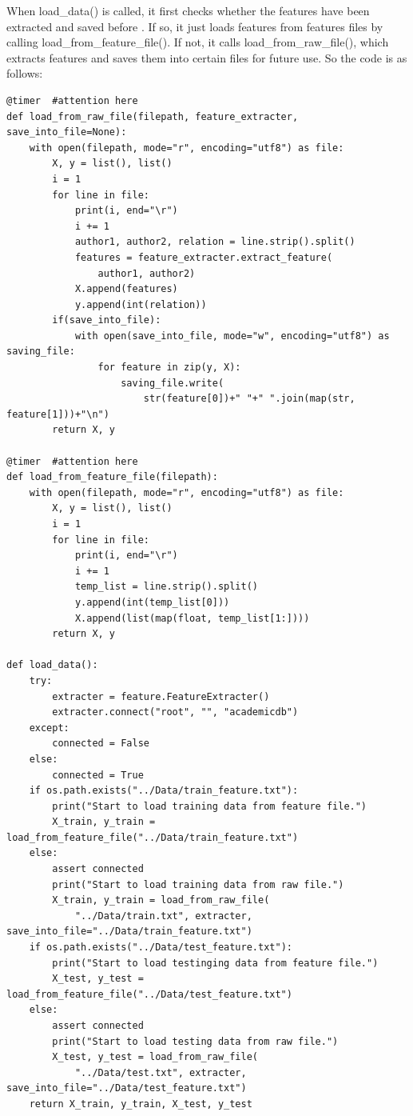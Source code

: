 \documentclass[a4paper]{article}
\begin{document}
When load\_data() is called, it first checks whether the features have been extracted and saved before
. If so, it just loads features from features files by calling load\_from\_feature\_file(). If not, it calls load\_from\_raw\_file(), which extracts features and saves them into certain files for future use. So the code is as follows:
\begin{verbatim}
@timer  #attention here
def load_from_raw_file(filepath, feature_extracter, save_into_file=None):
    with open(filepath, mode="r", encoding="utf8") as file:
        X, y = list(), list()
        i = 1
        for line in file:
            print(i, end="\r")
            i += 1
            author1, author2, relation = line.strip().split()
            features = feature_extracter.extract_feature(
                author1, author2)
            X.append(features)
            y.append(int(relation))
        if(save_into_file):
            with open(save_into_file, mode="w", encoding="utf8") as saving_file:
                for feature in zip(y, X):
                    saving_file.write(
                        str(feature[0])+" "+" ".join(map(str, feature[1]))+"\n")
        return X, y

@timer  #attention here
def load_from_feature_file(filepath):
    with open(filepath, mode="r", encoding="utf8") as file:
        X, y = list(), list()
        i = 1
        for line in file:
            print(i, end="\r")
            i += 1
            temp_list = line.strip().split()
            y.append(int(temp_list[0]))
            X.append(list(map(float, temp_list[1:])))
        return X, y

def load_data():
    try:
        extracter = feature.FeatureExtracter()
        extracter.connect("root", "", "academicdb")
    except:
        connected = False
    else:
        connected = True
    if os.path.exists("../Data/train_feature.txt"):
        print("Start to load training data from feature file.")
        X_train, y_train = load_from_feature_file("../Data/train_feature.txt")
    else:
        assert connected
        print("Start to load training data from raw file.")
        X_train, y_train = load_from_raw_file(
            "../Data/train.txt", extracter, save_into_file="../Data/train_feature.txt")
    if os.path.exists("../Data/test_feature.txt"):
        print("Start to load testinging data from feature file.")
        X_test, y_test = load_from_feature_file("../Data/test_feature.txt")
    else:
        assert connected
        print("Start to load testing data from raw file.")
        X_test, y_test = load_from_raw_file(
            "../Data/test.txt", extracter, save_into_file="../Data/test_feature.txt")
    return X_train, y_train, X_test, y_test
\end{verbatim}
\end{document}
